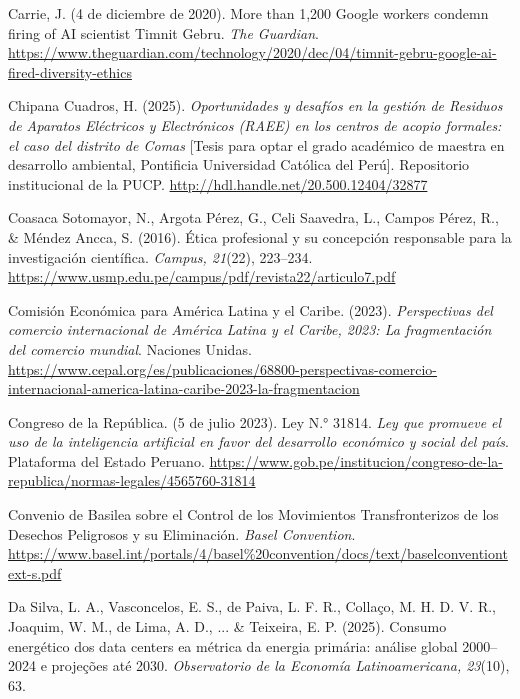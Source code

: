 \documentclass[stu,12pt,a4paper]{apa7}
\begin{document}
\begin{list}{}{
    \setlength{\leftmargin}{1.27cm}
    \setlength{\itemindent}{-1.27cm}  
    \setlength{\parsep}{0pt}       
    \setlength{\itemsep}{0.8em}      
}
\item Carrie, J. (4 de diciembre de 2020). More than 1,200 Google workers condemn firing of AI scientist Timnit Gebru. \textit{The Guardian}. \url{https://www.theguardian.com/technology/2020/dec/04/timnit-gebru-google-ai-fired-diversity-ethics}

\item Chipana Cuadros, H. (2025). \textit{Oportunidades y desafíos en la gestión de Residuos de Aparatos Eléctricos y Electrónicos (RAEE) en los centros de acopio formales: el caso del distrito de Comas} [Tesis para optar el grado académico de maestra en desarrollo ambiental, Pontificia Universidad Católica del Perú]. Repositorio institucional de la PUCP. \url{http://hdl.handle.net/20.500.12404/32877}

\item Coasaca Sotomayor, N., Argota Pérez, G., Celi Saavedra, L., Campos Pérez, R., \& Méndez Ancca, S. (2016). Ética profesional y su concepción responsable para la investigación científica. \textit{Campus, 21}(22), 223–234. \url{https://www.usmp.edu.pe/campus/pdf/revista22/articulo7.pdf}

\item Comisión Económica para América Latina y el Caribe. (2023). \textit{Perspectivas del comercio internacional de América Latina y el Caribe, 2023: La fragmentación del comercio mundial}. Naciones Unidas. \url{https://www.cepal.org/es/publicaciones/68800-perspectivas-comercio-internacional-america-latina-caribe-2023-la-fragmentacion}

\item Congreso de la República. (5 de julio 2023). Ley N.° 31814. \textit{Ley que promueve el uso de la inteligencia artificial en favor del desarrollo económico y social del país}. Plataforma del Estado Peruano. \url{https://www.gob.pe/institucion/congreso-de-la-republica/normas-legales/4565760-31814}

\item Convenio de Basilea sobre el Control de los Movimientos Transfronterizos de los Desechos Peligrosos y su Eliminación. \textit{Basel Convention}. \url{https://www.basel.int/portals/4/basel%20convention/docs/text/baselconventiontext-s.pdf}

\item Da Silva, L. A., Vasconcelos, E. S., de Paiva, L. F. R., Collaço, M. H. D. V. R., Joaquim, W. M., de Lima, A. D., ... \& Teixeira, E. P. (2025). Consumo energético dos data centers ea métrica da energia primária: análise global 2000–2024 e projeções até 2030. \textit{Observatorio de la Economía Latinoamericana, 23}(10), 63.


\end{list}
\end{document}
